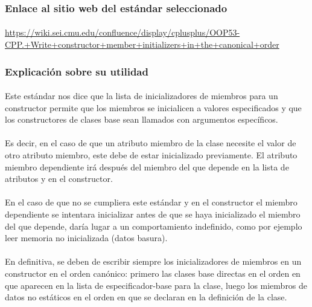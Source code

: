 		\subsubsection{Enlace al sitio web del estándar seleccionado}
		
			\paragraph{}\url{https://wiki.sei.cmu.edu/confluence/display/cplusplus/OOP53-CPP.+Write+constructor+member+initializers+in+the+canonical+order}
		
		\subsubsection{Explicación sobre su utilidad}
		
			\paragraph{}Este estándar nos dice que la lista de inicializadores de miembros para un constructor permite que los miembros se inicialicen a valores especificados y que los constructores de clases base sean llamados con argumentos específicos.
			
			\paragraph{}Es decir, en el caso de que un atributo miembro de la clase necesite el valor de otro atributo miembro, este debe de estar inicializado previamente. El atributo miembro dependiente irá después del miembro del que depende en la lista de atributos y en el constructor.
			
			\paragraph{}En el caso de que no se cumpliera este estándar y en el constructor el miembro dependiente se intentara inicializar antes de que se haya inicializado el miembro del que depende, daría lugar a un comportamiento indefinido, como por ejemplo leer memoria no inicializada (datos basura).
			
			\paragraph{}En definitiva, se deben de escribir siempre los inicializadores de miembros en un constructor en el orden canónico: primero las clases base directas en el orden en que aparecen en la lista de especificador-base para la clase, luego los miembros de datos no estáticos en el orden en que se declaran en la definición de la clase.
		

